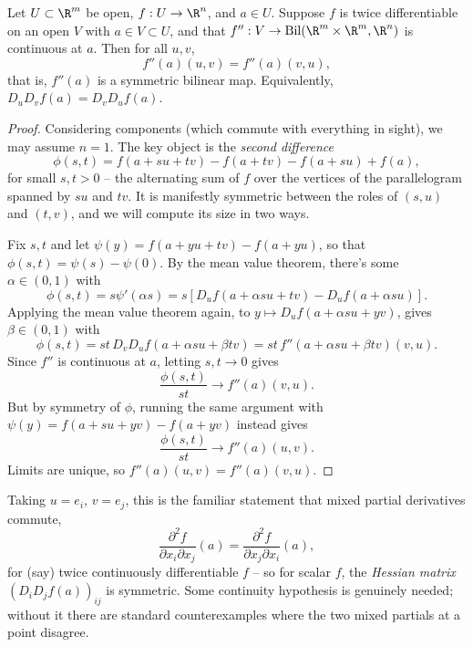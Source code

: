 \begin{theorem}
    Let $U \subset \R^m$ be open, $f: U \rightarrow \R^n$, and $a \in U$. Suppose $f$ is twice differentiable on an open $V$ with $a \in V \subset U$, and that $f'': V \rightarrow \operatorname{Bil}(\R^m \times \R^m, \R^n)$ is continuous at $a$. Then for all $u, v$,
    $$
    f''(a)(u, v) = f''(a)(v, u),
    $$
    that is, $f''(a)$ is a symmetric bilinear map. Equivalently, $D_uD_vf(a) = D_vD_uf(a)$.
\end{theorem}
\begin{proof}
    Considering components (which commute with everything in sight), we may assume $n = 1$. The key object is the \emph{second difference}
    $$
    \phi(s, t) = f(a + su + tv) - f(a + tv) - f(a + su) + f(a),
    $$
    for small $s, t > 0$ -- the alternating sum of $f$ over the vertices of the parallelogram spanned by $su$ and $tv$. It is manifestly symmetric between the roles of $(s, u)$ and $(t, v)$, and we will compute its size in two ways.

    Fix $s, t$ and let $\psi(y) = f(a + yu + tv) - f(a + yu)$, so that $\phi(s, t) = \psi(s) - \psi(0)$. By the mean value theorem, there's some $\alpha \in (0, 1)$ with
    $$
    \phi(s, t) = s\psi'(\alpha s) = s\left[D_uf(a + \alpha su + tv) - D_uf(a + \alpha su)\right].
    $$
    Applying the mean value theorem again, to $y \mapsto D_uf(a + \alpha su + yv)$, gives $\beta \in (0, 1)$ with
    $$
    \phi(s, t) = st\, D_vD_uf(a + \alpha su + \beta tv) = st\,f''(a + \alpha su + \beta tv)(v, u).
    $$
    Since $f''$ is continuous at $a$, letting $s, t \rightarrow 0$ gives
    $$
    \frac{\phi(s, t)}{st} \rightarrow f''(a)(v, u).
    $$
    But by symmetry of $\phi$, running the same argument with $\psi(y) = f(a + su + yv) - f(a + yv)$ instead gives
    $$
    \frac{\phi(s, t)}{st} \rightarrow f''(a)(u, v).
    $$
    Limits are unique, so $f''(a)(u, v) = f''(a)(v, u)$.
\end{proof}

\begin{remark}
    Taking $u = e_i$, $v = e_j$, this is the familiar statement that mixed partial derivatives commute,
    $$
    \frac{\partial^2 f}{\partial x_i \partial x_j}(a) = \frac{\partial^2 f}{\partial x_j \partial x_i}(a),
    $$
    for (say) twice continuously differentiable $f$ -- so for scalar $f$, the \emph{Hessian matrix} $(D_iD_jf(a))_{ij}$ is symmetric. Some continuity hypothesis is genuinely needed; without it there are standard counterexamples where the two mixed partials at a point disagree.
\end{remark}

